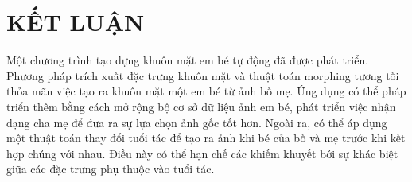 \documentclass[journal]{IEEEtran}
\begin{document}
\section{KẾT LUẬN}
Một chương trình tạo dựng khuôn mặt em bé tự động đã được phát triển. Phương pháp trích xuất đặc trưng khuôn mặt và thuật toán morphing tương tối thỏa mãn việc tạo ra khuôn mặt một em bé từ ảnh bố mẹ. Ứng dụng có thể pháp triển thêm bằng cách mở rộng bộ cơ sở dữ liệu ảnh em bé, phát triển việc nhận dạng cha mẹ để đưa ra sự lựa chọn ảnh gốc tốt hơn. Ngoài ra, có thể áp dụng một thuật toán thay đổi tuổi tác để tạo ra ảnh khi bé của bố và mẹ trước khi kết hợp chúng với nhau. Điều này có thể hạn chế các khiếm khuyết bới sự khác biệt giữa các đặc trưng phụ thuộc vào tuổi tác.

\begin{figure}[!t]
\centering
{}

\end{figure}
\end{document}
